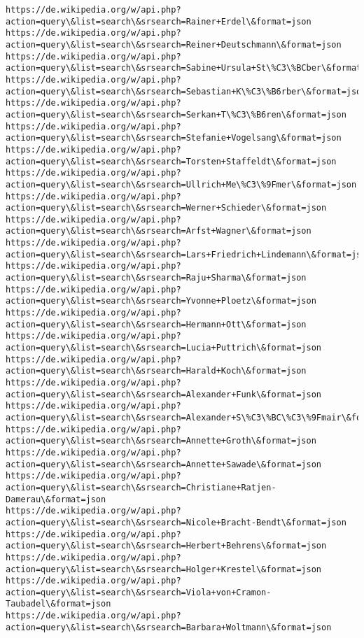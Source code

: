 \documentclass[11pt]{article}
\begin{document}
\begin{Verbatim}[commandchars=\\\{\}]
https://de.wikipedia.org/w/api.php?action=query\&list=search\&srsearch=Rainer+Erdel\&format=json
https://de.wikipedia.org/w/api.php?action=query\&list=search\&srsearch=Reiner+Deutschmann\&format=json
https://de.wikipedia.org/w/api.php?action=query\&list=search\&srsearch=Sabine+Ursula+St\%C3\%BCber\&format=json
https://de.wikipedia.org/w/api.php?action=query\&list=search\&srsearch=Sebastian+K\%C3\%B6rber\&format=json
https://de.wikipedia.org/w/api.php?action=query\&list=search\&srsearch=Serkan+T\%C3\%B6ren\&format=json
https://de.wikipedia.org/w/api.php?action=query\&list=search\&srsearch=Stefanie+Vogelsang\&format=json
https://de.wikipedia.org/w/api.php?action=query\&list=search\&srsearch=Torsten+Staffeldt\&format=json
https://de.wikipedia.org/w/api.php?action=query\&list=search\&srsearch=Ullrich+Me\%C3\%9Fmer\&format=json
https://de.wikipedia.org/w/api.php?action=query\&list=search\&srsearch=Werner+Schieder\&format=json
https://de.wikipedia.org/w/api.php?action=query\&list=search\&srsearch=Arfst+Wagner\&format=json
https://de.wikipedia.org/w/api.php?action=query\&list=search\&srsearch=Lars+Friedrich+Lindemann\&format=json
https://de.wikipedia.org/w/api.php?action=query\&list=search\&srsearch=Raju+Sharma\&format=json
https://de.wikipedia.org/w/api.php?action=query\&list=search\&srsearch=Yvonne+Ploetz\&format=json
https://de.wikipedia.org/w/api.php?action=query\&list=search\&srsearch=Hermann+Ott\&format=json
https://de.wikipedia.org/w/api.php?action=query\&list=search\&srsearch=Lucia+Puttrich\&format=json
https://de.wikipedia.org/w/api.php?action=query\&list=search\&srsearch=Harald+Koch\&format=json
https://de.wikipedia.org/w/api.php?action=query\&list=search\&srsearch=Alexander+Funk\&format=json
https://de.wikipedia.org/w/api.php?action=query\&list=search\&srsearch=Alexander+S\%C3\%BC\%C3\%9Fmair\&format=json
https://de.wikipedia.org/w/api.php?action=query\&list=search\&srsearch=Annette+Groth\&format=json
https://de.wikipedia.org/w/api.php?action=query\&list=search\&srsearch=Annette+Sawade\&format=json
https://de.wikipedia.org/w/api.php?action=query\&list=search\&srsearch=Christiane+Ratjen-Damerau\&format=json
https://de.wikipedia.org/w/api.php?action=query\&list=search\&srsearch=Nicole+Bracht-Bendt\&format=json
https://de.wikipedia.org/w/api.php?action=query\&list=search\&srsearch=Herbert+Behrens\&format=json
https://de.wikipedia.org/w/api.php?action=query\&list=search\&srsearch=Holger+Krestel\&format=json
https://de.wikipedia.org/w/api.php?action=query\&list=search\&srsearch=Viola+von+Cramon-Taubadel\&format=json
https://de.wikipedia.org/w/api.php?action=query\&list=search\&srsearch=Barbara+Woltmann\&format=json

\end{Verbatim}
\end{document}
